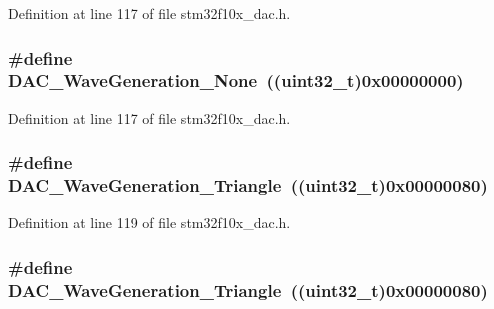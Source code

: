 Definition at line 117 of file stm32f10x\+\_\+dac.\+h.

\subsubsection[{\texorpdfstring{D\+A\+C\+\_\+\+Wave\+Generation\+\_\+\+None}{DAC_WaveGeneration_None}}]{\setlength{\rightskip}{0pt plus 5cm}\#define D\+A\+C\+\_\+\+Wave\+Generation\+\_\+\+None~(({\bf uint32\+\_\+t})0x00000000)}\hypertarget{group___d_a_c__wave__generation_gaabbcd575d6106267f6b65ce988158f29}{}\label{group___d_a_c__wave__generation_gaabbcd575d6106267f6b65ce988158f29}


Definition at line 117 of file stm32f10x\+\_\+dac.\+h.

\subsubsection[{\texorpdfstring{D\+A\+C\+\_\+\+Wave\+Generation\+\_\+\+Triangle}{DAC_WaveGeneration_Triangle}}]{\setlength{\rightskip}{0pt plus 5cm}\#define D\+A\+C\+\_\+\+Wave\+Generation\+\_\+\+Triangle~(({\bf uint32\+\_\+t})0x00000080)}\hypertarget{group___d_a_c__wave__generation_ga68f1a71011437a5ea6298ab039554714}{}\label{group___d_a_c__wave__generation_ga68f1a71011437a5ea6298ab039554714}


Definition at line 119 of file stm32f10x\+\_\+dac.\+h.

\subsubsection[{\texorpdfstring{D\+A\+C\+\_\+\+Wave\+Generation\+\_\+\+Triangle}{DAC_WaveGeneration_Triangle}}]{\setlength{\rightskip}{0pt plus 5cm}\#define D\+A\+C\+\_\+\+Wave\+Generation\+\_\+\+Triangle~(({\bf uint32\+\_\+t})0x00000080)}\hypertarget{group___d_a_c__wave__generation_ga68f1a71011437a5ea6298ab039554714}{}\label{group___d_a_c__wave__generation_ga68f1a71011437a5ea6298ab039554714}



